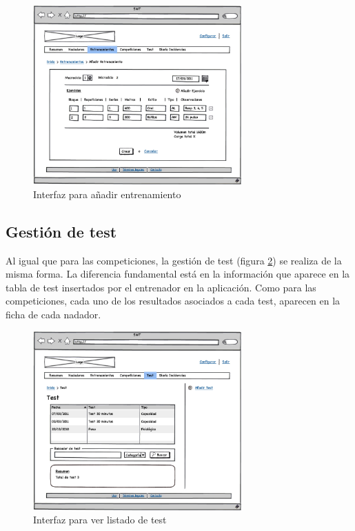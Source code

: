 		\begin{figure}[H]
		  \centering
		    \includegraphics[width=8cm]{./eps/p_interfaz/19_Entrenamientos_new.eps}
		  \caption{Interfaz para añadir entrenamiento}
		  \label{fig:interfaz_entrenamientos_new}
		\end{figure}

	
	\subsection{Gestión de test} %
		\label{sub:gestion_de_test}
	
	Al igual que para las competiciones, la gestión de test (figura \ref{fig:interfaz_test}) se realiza de la misma forma. La diferencia fundamental está en la información que aparece en la tabla de test insertados por el entrenador en la aplicación. Como para las competiciones, cada uno de los resultados asociados a cada test, aparecen en la ficha de cada nadador.
	
		\begin{figure}[H]
		  \centering
		    \includegraphics[width=8cm]{./eps/p_interfaz/26_Test.eps}
		  \caption{Interfaz para ver listado de test}
		  \label{fig:interfaz_test}
		\end{figure}
	
